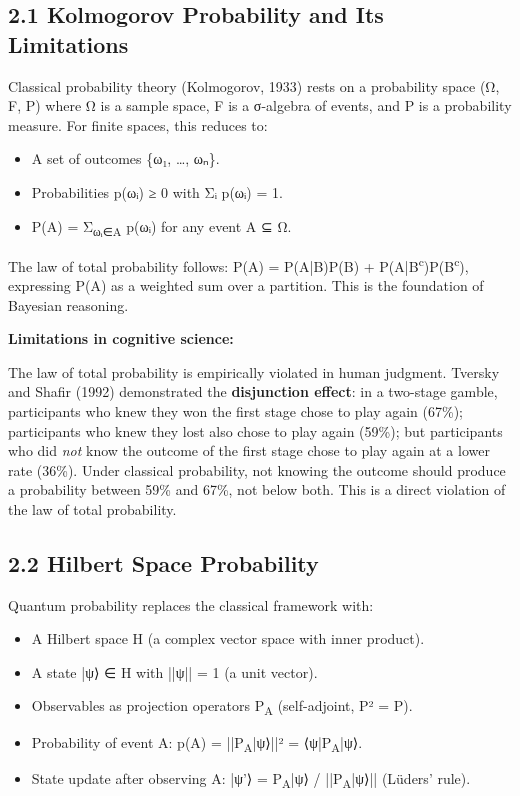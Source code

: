\documentclass[11pt]{article}
\begin{document}
\subsection{2.1 Kolmogorov Probability and Its Limitations}
\label{sec:org6f10e76}

Classical probability theory (Kolmogorov, 1933) rests on a probability space
(Ω, F, P) where Ω is a sample space, F is a σ-algebra of events, and P is a
probability measure. For finite spaces, this reduces to:
\begin{itemize}
\item A set of outcomes \{ω₁, \ldots{}, ωₙ\}.
\item Probabilities p(ωᵢ) ≥ 0 with Σᵢ p(ωᵢ) = 1.
\item P(A) = Σ\textsubscript{ωᵢ∈A} p(ωᵢ) for any event A ⊆ Ω.
\end{itemize}

The law of total probability follows: P(A) = P(A|B)P(B) + P(A|B\textsuperscript{c})P(B\textsuperscript{c}),
expressing P(A) as a weighted sum over a partition. This is the foundation of
Bayesian reasoning.

\textbf{Limitations in cognitive science:}

The law of total probability is empirically violated in human judgment.
Tversky and Shafir (1992) demonstrated the \textbf{disjunction effect}: in a
two-stage gamble, participants who knew they won the first stage chose to play
again (67\%); participants who knew they lost also chose to play again (59\%);
but participants who did \emph{not} know the outcome of the first stage chose to play
again at a lower rate (36\%). Under classical probability, not knowing the
outcome should produce a probability between 59\% and 67\%, not below both.
This is a direct violation of the law of total probability.
\subsection{2.2 Hilbert Space Probability}
\label{sec:org77c741b}

Quantum probability replaces the classical framework with:
\begin{itemize}
\item A Hilbert space H (a complex vector space with inner product).
\item A state |ψ⟩ ∈ H with ||ψ|| = 1 (a unit vector).
\item Observables as projection operators P\textsubscript{A} (self-adjoint, P² = P).
\item Probability of event A: p(A) = ||P\textsubscript{A}|ψ⟩||² = ⟨ψ|P\textsubscript{A}|ψ⟩.
\item State update after observing A: |ψ'⟩ = P\textsubscript{A}|ψ⟩ / ||P\textsubscript{A}|ψ⟩|| (Lüders' rule).
\end{itemize}
\end{document}
